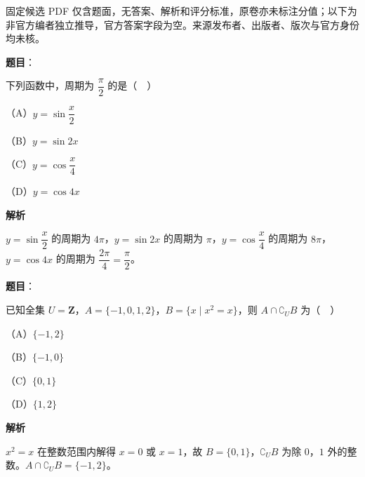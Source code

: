 

\begin{gktip}
固定候选 PDF 仅含题面，无答案、解析和评分标准，原卷亦未标注分值；以下为非官方编者独立推导，官方答案字段为空。来源发布者、出版者、版次与官方身份均未核。
\end{gktip}

\begin{answer}

\textbf{题目}：

下列函数中，周期为 $\dfrac{\pi}{2}$ 的是（　）

（A）$y=\sin\dfrac{x}{2}$

（B）$y=\sin2x$

（C）$y=\cos\dfrac{x}{4}$

（D）$y=\cos4x$

\textbf{解析}

$y=\sin\dfrac x2$ 的周期为 $4\pi$，$y=\sin2x$ 的周期为 $\pi$，$y=\cos\dfrac x4$ 的周期为 $8\pi$，$y=\cos4x$ 的周期为 $\dfrac{2\pi}{4}=\dfrac{\pi}{2}$。


\end{answer}
\begin{answer}

\textbf{题目}：

已知全集 $U=\mathbf Z$，$A=\{-1,0,1,2\}$，$B=\{x\mid x^2=x\}$，则 $A\cap\complement_UB$ 为（　）

（A）$\{-1,2\}$

（B）$\{-1,0\}$

（C）$\{0,1\}$

（D）$\{1,2\}$

\textbf{解析}

$x^2=x$ 在整数范围内解得 $x=0$ 或 $x=1$，故 $B=\{0,1\}$，$\complement_UB$ 为除 $0$，$1$ 外的整数。$A\cap\complement_UB=\{-1,2\}$。


\end{answer}
